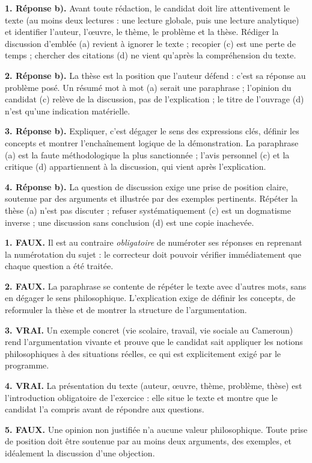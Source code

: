 \documentclass[11pt]{article}
\begin{document}
\begin{corrige}
\textbf{1. Réponse b).} Avant toute rédaction, le candidat doit lire attentivement le texte (au moins deux lectures : une lecture globale, puis une lecture analytique) et identifier l'auteur, l'œuvre, le thème, le problème et la thèse. Rédiger la discussion d'emblée (a) revient à ignorer le texte ; recopier (c) est une perte de temps ; chercher des citations (d) ne vient qu'après la compréhension du texte.

\textbf{2. Réponse b).} La thèse est la position que l'auteur défend : c'est sa réponse au problème posé. Un résumé mot à mot (a) serait une paraphrase ; l'opinion du candidat (c) relève de la discussion, pas de l'explication ; le titre de l'ouvrage (d) n'est qu'une indication matérielle.

\textbf{3. Réponse b).} Expliquer, c'est dégager le sens des expressions clés, définir les concepts et montrer l'enchaînement logique de la démonstration. La paraphrase (a) est la faute méthodologique la plus sanctionnée ; l'avis personnel (c) et la critique (d) appartiennent à la discussion, qui vient après l'explication.

\textbf{4. Réponse b).} La question de discussion exige une prise de position claire, soutenue par des arguments et illustrée par des exemples pertinents. Répéter la thèse (a) n'est pas discuter ; refuser systématiquement (c) est un dogmatisme inverse ; une discussion sans conclusion (d) est une copie inachevée.
\end{corrige}

\begin{corrige}
\textbf{1. FAUX.} Il est au contraire \emph{obligatoire} de numéroter ses réponses en reprenant la numérotation du sujet : le correcteur doit pouvoir vérifier immédiatement que chaque question a été traitée.

\textbf{2. FAUX.} La paraphrase se contente de répéter le texte avec d'autres mots, sans en dégager le sens philosophique. L'explication exige de définir les concepts, de reformuler la thèse et de montrer la structure de l'argumentation.

\textbf{3. VRAI.} Un exemple concret (vie scolaire, travail, vie sociale au Cameroun) rend l'argumentation vivante et prouve que le candidat sait appliquer les notions philosophiques à des situations réelles, ce qui est explicitement exigé par le programme.

\textbf{4. VRAI.} La présentation du texte (auteur, œuvre, thème, problème, thèse) est l'introduction obligatoire de l'exercice : elle situe le texte et montre que le candidat l'a compris avant de répondre aux questions.

\textbf{5. FAUX.} Une opinion non justifiée n'a aucune valeur philosophique. Toute prise de position doit être soutenue par au moins deux arguments, des exemples, et idéalement la discussion d'une objection.
\end{corrige}
\end{document}
